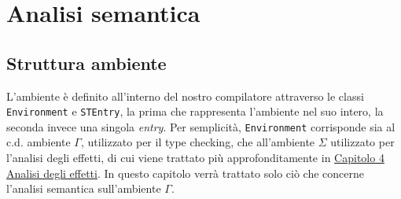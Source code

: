 \documentclass[../report.tex]{subfiles}
\begin{document}
\chapter{Analisi semantica}\label{c:analisi-semantica}
\section{Struttura ambiente}\label{s:struttura-ambiente}
L'ambiente è definito all'interno del nostro compilatore attraverso le classi \verb|Environment| e \verb|STEntry|, la prima che rappresenta l'ambiente nel suo intero, la seconda invece una singola \textit{entry}.
Per semplicità, \verb|Environment| corrisponde sia al c.d. ambiente $\Gamma{}$, utilizzato per il type checking, che all'ambiente $\Sigma{}$ utilizzato per l'analisi degli effetti, di cui viene trattato più approfonditamente in \hyperref[c:analisi-effetti]{Capitolo 4 Analisi degli effetti}.
In questo capitolo verrà trattato solo ciò che concerne l'analisi semantica sull'ambiente $\Gamma{}$.
\end{document}
